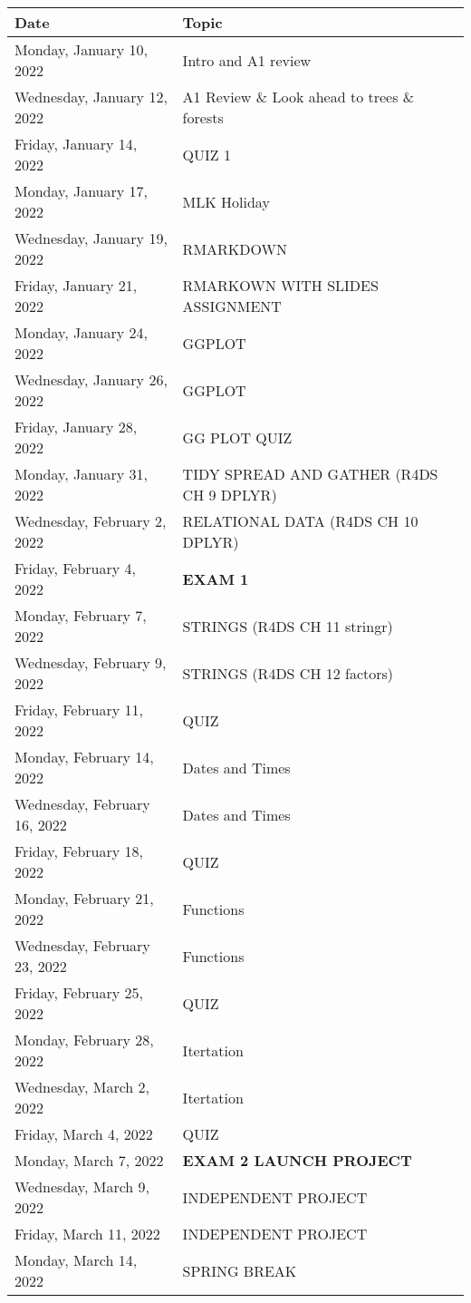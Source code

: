 \documentclass[
]{book}
\theoremstyle{definition}
\theoremstyle{definition}
\theoremstyle{definition}
\theoremstyle{definition}
\theoremstyle{remark}
\begin{document}
\begin{longtable}[]{@{}ll@{}}
\toprule
Date & Topic \\
\midrule
\endhead
Monday, January 10, 2022 & Intro and A1 review \\
Wednesday, January 12, 2022 & A1 Review \& Look ahead to trees \& forests \\
Friday, January 14, 2022 & QUIZ 1 \\
Monday, January 17, 2022 & MLK Holiday \\
Wednesday, January 19, 2022 & RMARKDOWN \\
Friday, January 21, 2022 & RMARKOWN WITH SLIDES ASSIGNMENT \\
Monday, January 24, 2022 & GGPLOT \\
Wednesday, January 26, 2022 & GGPLOT \\
Friday, January 28, 2022 & GG PLOT QUIZ \\
Monday, January 31, 2022 & TIDY SPREAD AND GATHER (R4DS CH 9 DPLYR) \\
Wednesday, February 2, 2022 & RELATIONAL DATA (R4DS CH 10 DPLYR) \\
Friday, February 4, 2022 & \textbf{EXAM 1} \\
Monday, February 7, 2022 & STRINGS (R4DS CH 11 stringr) \\
Wednesday, February 9, 2022 & STRINGS (R4DS CH 12 factors) \\
Friday, February 11, 2022 & QUIZ \\
Monday, February 14, 2022 & Dates and Times \\
Wednesday, February 16, 2022 & Dates and Times \\
Friday, February 18, 2022 & QUIZ \\
Monday, February 21, 2022 & Functions \\
Wednesday, February 23, 2022 & Functions \\
Friday, February 25, 2022 & QUIZ \\
Monday, February 28, 2022 & Itertation \\
Wednesday, March 2, 2022 & Itertation \\
Friday, March 4, 2022 & QUIZ \\
Monday, March 7, 2022 & \textbf{EXAM 2 LAUNCH PROJECT} \\
Wednesday, March 9, 2022 & INDEPENDENT PROJECT \\
Friday, March 11, 2022 & INDEPENDENT PROJECT \\
Monday, March 14, 2022 & SPRING BREAK \\

\end{longtable}
\end{document}
